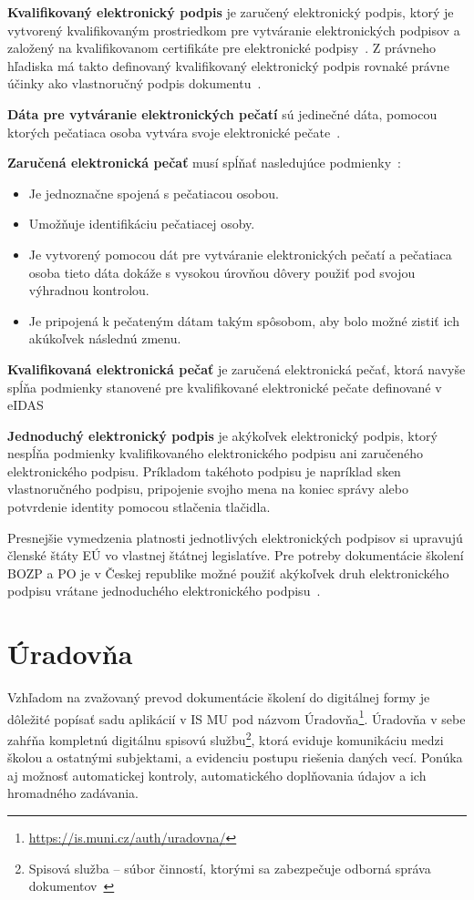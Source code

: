 \documentclass[
  digital,     %
  oneside,     %
  nosansbold,  %
  nocolorbold, %
  lof,         %
  nolot,         %
]{fithesis4}
\begin{document}
\textbf{Kvalifikovaný elektronický podpis} je zaručený elektronický podpis, ktorý je vytvorený kvalifikovaným prostriedkom pre vytváranie elektronických podpisov a založený na kvalifikovanom certifikáte pre elektronické podpisy~\cite[čl.~3,~odst.~12]{eidas2024}. Z právneho hľadiska má takto definovaný kvalifikovaný elektronický podpis rovnaké právne účinky ako vlastnoručný podpis dokumentu~\cite[čl.~25,~odst.~2]{eidas2024}.

\textbf{Dáta pre vytváranie elektronických pečatí} sú jedinečné dáta, pomocou ktorých pečatiaca osoba vytvára svoje elektronické pečate~\cite[čl.~3,~odst.~13]{eidas2024}.

\textbf{Zaručená elektronická pečať} musí spĺňať nasledujúce podmienky~\cite[čl.~3,~odst.~26]{eidas2024}:
\begin{itemize}
    \item Je jednoznačne spojená s pečatiacou osobou.
    \item Umožňuje identifikáciu pečatiacej osoby.
    \item Je vytvorený pomocou dát pre vytváranie elektronických pečatí a pečatiaca osoba tieto dáta dokáže s vysokou úrovňou dôvery použiť pod svojou výhradnou kontrolou.
    \item Je pripojená k pečateným dátam takým spôsobom, aby bolo možné zistiť ich akúkoľvek následnú zmenu.~\cite[čl.~26]{eidas2024}
\end{itemize}

\textbf{Kvalifikovaná elektronická pečať} je zaručená elektronická pečať, ktorá navyše spĺňa podmienky stanovené pre kvalifikované elektronické pečate definované v eIDAS~\cite[čl.~3,~odst.~27]{eidas2024}

\textbf{Jednoduchý elektronický podpis} je akýkoľvek elektronický podpis, ktorý nespĺňa podmienky kvalifikovaného elektronického podpisu ani zaručeného elektronického podpisu. Príkladom takéhoto podpisu je napríklad sken vlastnoručného podpisu, pripojenie svojho mena na koniec správy alebo potvrdenie identity pomocou stlačenia tlačidla.

Presnejšie vymedzenia platnosti jednotlivých elektronických podpisov si upravujú členské štáty EÚ vo vlastnej štátnej legislatíve. Pre potreby dokumentácie školení BOZP a PO je v Českej republike možné použiť akýkoľvek druh elektronického podpisu vrátane jednoduchého elektronického podpisu~\cite[§~7]{cesko_el_podpisy}.


\chapter{Úradovňa}
\enlargethispage{\baselineskip}  %
\label{kap-5}
Vzhľadom na zvažovaný prevod dokumentácie školení do digitálnej formy je dôležité popísať sadu aplikácií v IS MU pod názvom Úradovňa\footnote{\url{https://is.muni.cz/auth/uradovna/}}. Úradovňa v sebe zahŕňa kompletnú digitálnu spisovú službu\footnote{Spisová služba -- súbor činností, ktorými sa zabezpečuje odborná správa dokumentov~\cite[§~2~odst.~l]{cesko_spis_sl}}, ktorá eviduje komunikáciu medzi školou a ostatnými subjektami, a evidenciu postupu riešenia daných vecí. Ponúka aj možnosť automatickej kontroly, automatického doplňovania údajov a ich hromadného zadávania.
\end{document}
